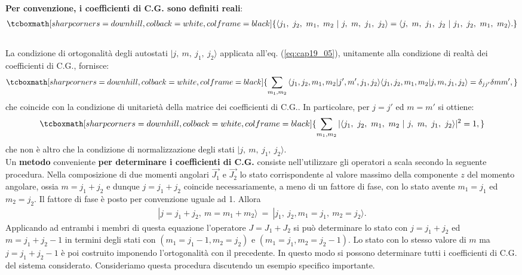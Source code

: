 \documentclass[a4paper,12pt,oneside]{book}
\begin{document}
\textbf{Per convenzione, i coefficienti di C.G. sono definiti reali}:
	\begin{align}
		\tcboxmath[sharp corners=downhill, colback=white, colframe=black]{
			\langle j_1 ,~ j_2,~m_1, ~ m_2~ |~ j ,~ m,~j_1, ~ j_2 \rangle  = \langle j ,~ m,~j_1, ~ j_2~ |~ j_1 ,~ j_2,~m_1, ~ m_2 \rangle .
			}
	\end{align}\\
	
La condizione di ortogonalità degli autostati $\mid j ,~ m,~j_1, ~ j_2 \rangle $ applicata all'eq. (\ref{eq:cap19_05}), unitamente alla condizione di realtà dei coefficienti di C.G., fornisce:
	\begin{equation}
		\tcboxmath[sharp corners=downhill, colback=white, colframe=black]{
			\sum_{m_1, m_2} {\langle j_1 , j_2, m_1, m_2 | j' , m', j_1, j_2 \rangle  \langle j_1 , j_2, m_1, m_2  | j , m, j_1, j_2 \rangle } = \delta_{j j'} \delta{m m'},
			}
	\end{equation}
che coincide con la condizione di unitarietà della matrice dei coefficienti di C.G.. In particolare, per $j=j'$ ed $m=m'$ si ottiene:
	\begin{equation}
		\tcboxmath[sharp corners=downhill, colback=white, colframe=black]{
			\sum_{m_1, m_2} {|\langle j_1 ,~ j_2,~m_1, ~ m_2 ~|~ j ,~ m,~j_1, ~ j_2 \rangle|^2} =1 ,
			}
	\end{equation}
che non è altro che la condizione di normalizzazione degli stati $| j ,~ m,~j_1, ~ j_2 \rangle $. \\

Un \textbf{metodo} conveniente \textbf{per determinare i coefficienti di C.G.} consiste nell'utilizzare gli operatori a scala secondo la seguente procedura. Nella composizione di due momenti angolari $\vec{J_1}$ e  $\vec{J_2}$ lo stato corrispondente al valore massimo della componente $z$ del momento angolare, ossia $m= j_1+j_2$ e dunque $j=j_1+j_2$ coincide necessariamente, a meno di un fattore di fase, con lo stato avente $m_1=j_1$ ed $m_2=j_2$. Il fattore di fase è posto per convenzione uguale ad 1. Allora
	\begin{align}
		| j= j_1 + j_2 ,~m= m_1 +m_2  \rangle ~= ~| j_1 ,~j_2,  m_1=j_1, ~m_2= j_2 \rangle .
	\end{align}
Applicando ad entrambi i membri di questa equazione l'operatore $J=J_1+J_2$ si può determinare lo stato con $j=j_1+j_2$ ed $m=j_1+j_2-1$ in termini degli stati con $(m_1=j_1-1 , m_2=j_2)$ e $(m_1=j_1, m_2=j_2-1)$. Lo stato con lo stesso valore di $m$ ma $j=j_1+j_2-1$ è poi costruito imponendo l'ortogonalità con il precedente. In questo modo si possono determinare tutti i coefficienti di C.G. del sistema considerato. Consideriamo questa procedura discutendo un esempio specifico importante.
\end{document}
